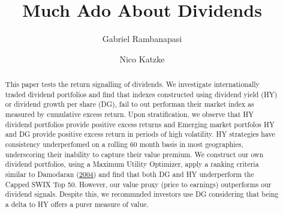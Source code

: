 \documentclass[10pt,preprint, authoryear]{elsarticle}
\numberwithin{equation}{section}
\numberwithin{figure}{section}
\numberwithin{table}{section}
\begin{document}
\begin{frontmatter}  %

\title{Much Ado About Dividends}





\author[Add1]{Gabriel Rambanapasi}

\author[Add2]{Nico Katzke}
\ead{}




\address[Add1]{Stellenbosch University, Cape Town, South Africa}
\address[Add2]{Satrix, Cape Town, South Africa}


\begin{abstract}
\small{
This paper tests the return signalling of dividends. We investigate
internationally traded dividend portfolios and find that indexes
constructed using dividend yield (HY) or dividend growth per share (DG),
fail to out performan their market index as measured by cumulative
excess return. Upon stratification, we observe that HY dividend
portfolios provide positive excess returns and Emerging market portfolos
HY and DG provide positive excess return in periods of high volatility.
HY strategies have consistency underperfomed on a rolling 60 month basis
in most geographies, underscoring their inability to capture their value
premium. We construct our own dividend portfolios, using a Maximum
Utility Optimizer, apply a ranking criteria similar to Damodaran
(\protect\hyperlink{ref-damodaran2004investment}{2004}) and find that
both DG and HY underperform the Capped SWIX Top 50. However, our value
proxy (price to earnings) outperforms our dividend signals. Despite
this, we recommnded investors use DG considering that being a delta to
HY offers a purer measure of value.
}
\end{abstract}

\vspace{1cm}





\vspace{0.5cm}

\end{frontmatter}

\setcounter{footnote}{0}



\pagestyle{fancy}
\chead{}
\rhead{}
\lfoot{}
\lhead{}
\cfoot{}
\end{document}
